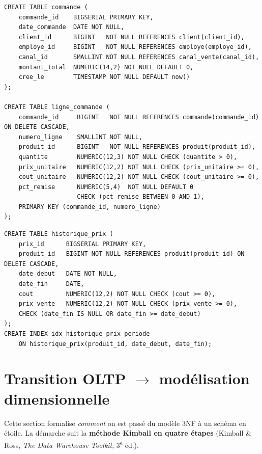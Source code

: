 \documentclass[11pt,a4paper]{article}
\begin{document}
\begin{lstlisting}[style=sql,caption={Tables de commandes (extrait)},label={lst:order}]
CREATE TABLE commande (
    commande_id    BIGSERIAL PRIMARY KEY,
    date_commande  DATE NOT NULL,
    client_id      BIGINT   NOT NULL REFERENCES client(client_id),
    employe_id     BIGINT   NOT NULL REFERENCES employe(employe_id),
    canal_id       SMALLINT NOT NULL REFERENCES canal_vente(canal_id),
    montant_total  NUMERIC(14,2) NOT NULL DEFAULT 0,
    cree_le        TIMESTAMP NOT NULL DEFAULT now()
);

CREATE TABLE ligne_commande (
    commande_id     BIGINT   NOT NULL REFERENCES commande(commande_id) ON DELETE CASCADE,
    numero_ligne    SMALLINT NOT NULL,
    produit_id      BIGINT   NOT NULL REFERENCES produit(produit_id),
    quantite        NUMERIC(12,3) NOT NULL CHECK (quantite > 0),
    prix_unitaire   NUMERIC(12,2) NOT NULL CHECK (prix_unitaire >= 0),
    cout_unitaire   NUMERIC(12,2) NOT NULL CHECK (cout_unitaire >= 0),
    pct_remise      NUMERIC(5,4)  NOT NULL DEFAULT 0
                    CHECK (pct_remise BETWEEN 0 AND 1),
    PRIMARY KEY (commande_id, numero_ligne)
);
\end{lstlisting}

\begin{lstlisting}[style=sql,caption={Historique de prix avec validité ouverte},label={lst:price}]
CREATE TABLE historique_prix (
    prix_id      BIGSERIAL PRIMARY KEY,
    produit_id   BIGINT NOT NULL REFERENCES produit(produit_id) ON DELETE CASCADE,
    date_debut   DATE NOT NULL,
    date_fin     DATE,
    cout         NUMERIC(12,2) NOT NULL CHECK (cout >= 0),
    prix_vente   NUMERIC(12,2) NOT NULL CHECK (prix_vente >= 0),
    CHECK (date_fin IS NULL OR date_fin >= date_debut)
);
CREATE INDEX idx_historique_prix_periode
    ON historique_prix(produit_id, date_debut, date_fin);
\end{lstlisting}

\newpage
\section{Transition OLTP $\to$ modélisation dimensionnelle}
\label{sec:transition}

Cette section formalise \emph{comment} on est passé du modèle 3NF à un schéma
en étoile. La démarche suit la \textbf{méthode Kimball en quatre étapes}
(Kimball \& Ross, \emph{The Data Warehouse Toolkit}, 3\textsuperscript{e} éd.).
\end{document}

